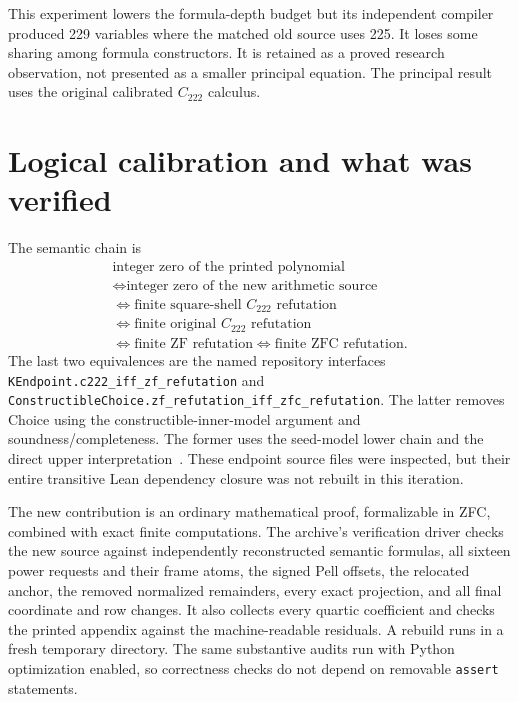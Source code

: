 \documentclass[11pt]{article}
\theoremstyle{definition}\newtheorem{remark}[theorem]{Remark}
\begin{document}
This experiment lowers the formula-depth budget but its independent
compiler produced 229 variables where the matched old source uses 225.
It loses some sharing among formula constructors. It is retained as a
proved research observation, not presented as a smaller principal equation.
The principal result uses the original calibrated $C_{222}$ calculus.

\section{Logical calibration and what was verified}

The semantic chain is
\[
\begin{gathered}
 \text{integer zero of the printed polynomial}\\
 \Longleftrightarrow\text{integer zero of the new arithmetic source}\\
 \Longleftrightarrow\text{finite square-shell }C_{222}\text{ refutation}\\
 \Longleftrightarrow\text{finite original }C_{222}\text{ refutation}\\
 \Longleftrightarrow\text{finite ZF refutation}
 \Longleftrightarrow\text{finite ZFC refutation}.
\end{gathered}
\]
The last two equivalences are the named repository interfaces
\nolinkurl{KEndpoint.c222_iff_zf_refutation} and
\nolinkurl{ConstructibleChoice.zf_refutation_iff_zfc_refutation}.
The latter removes Choice using the constructible-inner-model argument
and soundness/completeness. The former uses the seed-model lower chain
and the direct upper interpretation~\cite{calibration}.
These endpoint source files were inspected, but their entire transitive
Lean dependency closure was not rebuilt in this iteration.

The new contribution is an ordinary mathematical proof, formalizable in
ZFC, combined with exact finite computations. The archive's verification
driver checks the new source against independently reconstructed semantic
formulas, all sixteen power requests and their frame atoms, the signed
Pell offsets, the relocated anchor, the removed normalized remainders,
every exact projection, and all final coordinate and row changes. It also
collects every quartic coefficient and checks the printed appendix against
the machine-readable residuals. A rebuild runs in a fresh temporary
directory. The same substantive audits run with Python optimization enabled,
so correctness checks do not depend on removable \texttt{assert} statements.
\end{document}
